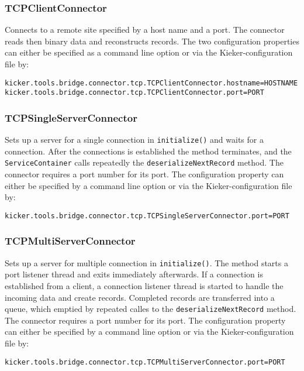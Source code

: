 \documentclass[11pt,a4paper]{article}
\begin{document}
%
\subsubsection{TCPClientConnector}

Connects to a remote site specified by a host name and a port. The connector reads then binary data and reconstructs records. The two configuration properties can either be specified as a command line option or via the Kieker-configuration file by:

\begin{verbatim}
kicker.tools.bridge.connector.tcp.TCPClientConnector.hostname=HOSTNAME
kicker.tools.bridge.connector.tcp.TCPClientConnector.port=PORT
\end{verbatim}

%
\subsubsection{TCPSingleServerConnector}

Sets up a server for a single connection in \texttt{initialize()} and waits for a connection. After the connections is established the method terminates, and the \texttt{ServiceContainer} calls repeatedly the \texttt{deserializeNextRecord} method. The connector requires a port number for its port. The configuration property can either be specified by a command line option or via the Kieker-configuration file by:

\begin{verbatim}
kicker.tools.bridge.connector.tcp.TCPSingleServerConnector.port=PORT
\end{verbatim}

%
\subsubsection{TCPMultiServerConnector}

Sets up a server for multiple connection in \texttt{initialize()}. The method starts a port listener thread and exits immediately afterwards. If a connection is established from a client, a connection listener thread is started to handle the incoming data and create records. Completed records are transferred into a queue, which emptied by repeated calles to the \texttt{deserializeNextRecord} method. The connector requires a port number for its port. The configuration property can either be specified by a command line option or via the Kieker-configuration file by:

\begin{verbatim}
kicker.tools.bridge.connector.tcp.TCPMultiServerConnector.port=PORT
\end{verbatim}
\end{document}
